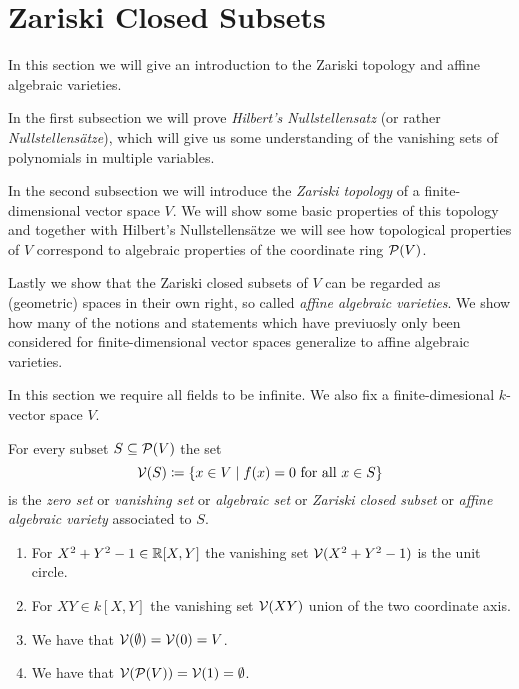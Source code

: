 \section{Zariski Closed Subsets}


\begin{fluff}
  In this section we will give an introduction to the Zariski topology and affine algebraic varieties.
  
  In the first subsection we will prove \emph{Hilbert’s Nullstellensatz} (or rather \emph{Nullstellensätze}), which will give us some understanding of the vanishing sets of polynomials in multiple variables.
  
  In the second subsection we will introduce the \emph{Zariski topology} of a finite-dimensional vector space $V$.
  We will show some basic properties of this topology and together with Hilbert’s Nullstellensätze we will see how topological properties of $V$ correspond to algebraic properties of the coordinate ring $\mathcal{P}(V)$.
  
  Lastly we show that the Zariski closed subsets of $V$ can be regarded as (geometric) spaces in their own right, so called \emph{affine algebraic varieties}.
  We show how many of the notions and statements which have previuosly only been considered for finite-dimensional vector spaces generalize to affine algebraic varieties.
\end{fluff}


\begin{conventions}
  In this section we require all fields to be infinite.
  We also fix a finite-dimesional $k$-vector space $V$.
\end{conventions}


\begin{definition}
  For every subset $S \subseteq \mathcal{P}(V)$ the set
  \[
              \mathcal{V}(S)
    \coloneqq \{
                x \in V
              \mid
                \text{$f(x) = 0$ for all $x \in S$}
              \}
  \]
  is the \emph{zero set} or \emph{vanishing set} or \emph{algebraic set} or \emph{Zariski closed subset} or \emph{affine algebraic variety} associated to $S$.
\end{definition}


\begin{example}
  \label{example: examples of algebraic subsets}
  \leavevmode
  \begin{enumerate}
    \item
      For $X^2 + Y^2 - 1 \in \mathbb{R}[X,Y]$ the vanishing set $\mathcal{V}(X^2 + Y^2 - 1)$ is the unit circle.
    \item
      For $XY \in k[X,Y]$ the vanishing set $\mathcal{V}(XY)$ union of the two coordinate axis.
    \item
      We have that $\mathcal{V}(\emptyset) = \mathcal{V}(0) = V$.
    \item
      We have that $\mathcal{V}(\mathcal{P}(V)) = \mathcal{V}(1) = \emptyset$.
  \end{enumerate}
\end{example}

